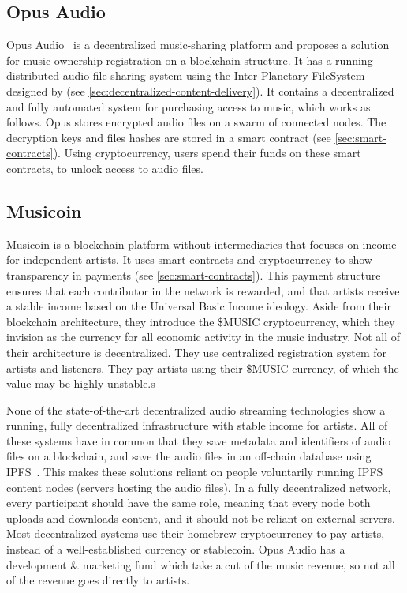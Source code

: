 \subsection{Opus Audio}
Opus Audio~\citep{jia2016opus} is a decentralized music-sharing platform and proposes a solution for music ownership registration on a blockchain structure. It has a running distributed audio file sharing system using the Inter-Planetary FileSystem designed by \cite{benet2014ipfs} (see \ref{sec:decentralized-content-delivery}). It contains a decentralized and fully automated system for purchasing access to music, which works as follows. Opus stores encrypted audio files on a swarm of connected nodes. The decryption keys and files hashes are stored in a smart contract (see \ref{sec:smart-contracts}). Using cryptocurrency, users spend their funds on these smart contracts, to unlock access to audio files.

\subsection{Musicoin}
Musicoin is a blockchain platform without intermediaries that focuses on income for independent artists. It uses smart contracts and cryptocurrency to show transparency in payments (see \ref{sec:smart-contracts}). This payment structure ensures that each contributor in the network is rewarded, and that artists receive a stable income based on the Universal Basic Income ideology. Aside from their blockchain architecture, they introduce the \$MUSIC cryptocurrency, which they invision as the currency for all economic activity in the music industry. Not all of their architecture is decentralized. They use centralized registration system for artists and listeners. They pay artists using their \$MUSIC currency, of which the value may be highly unstable.s

None of the state-of-the-art decentralized audio streaming technologies show a running, fully decentralized infrastructure with stable income for artists. All of these systems have in common that they save metadata and identifiers of audio files on a blockchain, and save the audio files in an off-chain database using IPFS~\citep{benet2014ipfs}. This makes these solutions reliant on people voluntarily running IPFS content nodes (servers hosting the audio files). In a fully decentralized network, every participant should have the same role, meaning that every node both uploads and downloads content, and it should not be reliant on external servers. Most decentralized systems use their homebrew cryptocurrency to pay artists, instead of a well-established currency or stablecoin. Opus Audio has a development \& marketing fund which take a cut of the music revenue, so not all of the revenue goes directly to artists.

